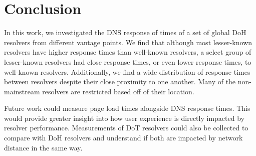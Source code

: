 \section{Conclusion}\label{sec:conclusion}
In this work, we investigated the DNS response of times of a set of global DoH resolvers from different vantage points.
We find that although most lesser-known resolvers have higher response times than well-known resolvers, a select group of lesser-known resolvers had close response times, or even lower response times, to well-known resolvers. 
Additionally, we find a wide distribution of response times between resolvers despite their close proximity to one another.  
Many of the non-mainstream resolvers are restricted based off of their location.  

Future work could measure page load times alongside DNS response times. 
This would provide greater insight into how user experience is directly impacted by resolver performance.
Measurements of DoT resolvers could also be collected to compare with DoH resolvers and understand if both are impacted by network distance in the same way. 
